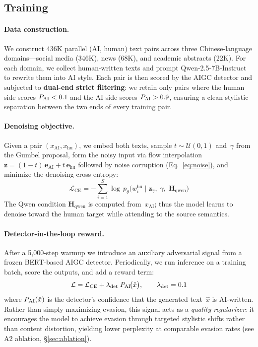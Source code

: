 \subsection{Training}
\label{sec:training}

\paragraph{Data construction.}
We construct 436K parallel (AI, human) text pairs across three
Chinese-language domains---social media (346K), news (68K), and
academic abstracts (22K).
For each domain, we collect human-written texts and prompt
Qwen-2.5-7B-Instruct to rewrite them into AI style.
Each pair is then scored by the AIGC detector and subjected to
\textbf{dual-end strict filtering}: we retain only pairs where
the human side scores $P_{\text{AI}} < 0.1$ and the AI side scores
$P_{\text{AI}} > 0.9$, ensuring a clean stylistic separation between
the two ends of every training pair.

\paragraph{Denoising objective.}
Given a pair $(x_{\mathrm{AI}}, x_{\mathrm{hu}})$, we embed
both texts, sample $t\!\sim\!\mathcal{U}(0,1)$ and~$\gamma$
from the Gumbel proposal, form the noisy input via flow
interpolation
$\mathbf{z}
  = (1{-}t)\,\mathbf{e}_{\mathrm{AI}}
  + t\,\mathbf{e}_{\mathrm{hu}}$
followed by noise corruption (Eq.~\ref{eq:noise}), and
minimize the denoising cross-entropy:
\begin{equation}
    \mathcal{L}_{\mathrm{CE}}
      = -\!\sum_{i=1}^{S}
          \log\, p_\theta\!\bigl(
            w_i^{\mathrm{hu}}
            \;\big|\;
            \mathbf{z}_\gamma,\; \gamma,\;
            \mathbf{H}_{\mathrm{qwen}}
          \bigr)
    \label{eq:ce}
\end{equation}
The Qwen condition $\mathbf{H}_{\mathrm{qwen}}$ is computed
from~$x_{\mathrm{AI}}$; thus the model learns to denoise
toward the human target while attending to the source semantics.

\paragraph{Detector-in-the-loop reward.}
After a 5{,}000-step warmup we introduce an auxiliary
adversarial signal from a frozen BERT-based AIGC detector.
Periodically, we run inference on a training batch, score the
outputs, and add a reward term:
\begin{equation}
    \mathcal{L}
      = \mathcal{L}_{\mathrm{CE}}
      + \lambda_{\mathrm{det}}\;
        P_{\text{AI}}\!\bigl(\hat{x}\bigr),
    \qquad \lambda_{\mathrm{det}} = 0.1
    \label{eq:loss}
\end{equation}
where $P_{\text{AI}}(\hat{x})$ is the detector's confidence that the
generated text~$\hat{x}$ is AI-written.
Rather than simply maximizing evasion, this signal acts as a
\emph{quality regularizer}: it encourages the model to achieve
evasion through targeted stylistic shifts rather than content
distortion, yielding lower perplexity at comparable evasion
rates (see A2 ablation, \S\ref{sec:ablation}).

